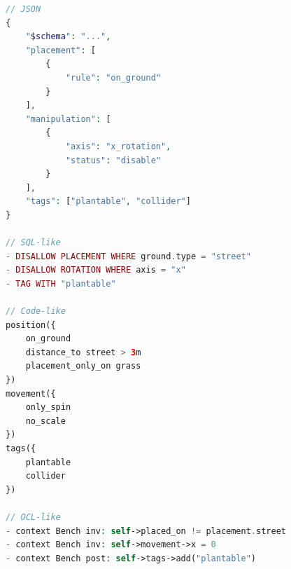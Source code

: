 \begin{lstlisting}[frame=htrbl, caption={Schemaformate}, label={lst:schemaformate}, language=php]
// JSON
{
    "$schema": "...",
    "placement": [
        {
            "rule": "on_ground"
        }
    ],
    "manipulation": [
        {
            "axis": "x_rotation",
            "status": "disable"
        }
    ],
    "tags": ["plantable", "collider"]
}

// SQL-like
- DISALLOW PLACEMENT WHERE ground.type = "street"
- DISALLOW ROTATION WHERE axis = "x"
- TAG WITH "plantable"
    
// Code-like
position({
    on_ground
    distance_to street > 3m
    placement_only_on grass
})
movement({
    only_spin
    no_scale
})
tags({
    plantable
    collider
})

// OCL-like
- context Bench inv: self->placed_on != placement.street
- context Bench inv: self->movement->x = 0
- context Bench post: self->tags->add("plantable")
\end{lstlisting}
